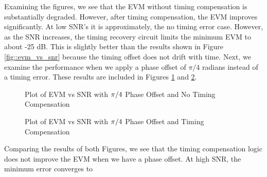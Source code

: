 \documentclass{article}
\begin{document}
Examining the figures, we see that the EVM without timing compensation is substantially degraded. However, after timing compensation, the EVM improves significantly. At low SNR's it is approximately, the no timing error case. However, as the SNR increases, the timing recovery circuit limits the minimum EVM to about -25 dB. This is slightly better than the results shown in Figure \ref{fig::evm_vs_snr} because the timing offset does not drift with time. Next, we examine the performance when we apply a phase offset of $\pi/4$ radians instead of a timing error. These results are included in Figures \ref{fig::evm_pi_4_phase_offset_no_comp} and \ref{fig::evm_pi_4_phase_offset}.

\begin{figure}[H]
	\centerline{}
	\caption{Plot of EVM vs SNR with $\protect\pi/4$ Phase Offset and No Timing Compensation}
	\label{fig::evm_pi_4_phase_offset_no_comp}
\end{figure}

\begin{figure}[H]
	\centerline{}
	\caption{Plot of EVM vs SNR with $\protect\pi/4$ Phase Offset and Timing Compensation}
	\label{fig::evm_pi_4_phase_offset}
\end{figure}

Comparing the results of both Figures, we see that the timing compensation logic does not improve the EVM when we have a phase offset. At high SNR, the minimum error converges to
\end{document}
